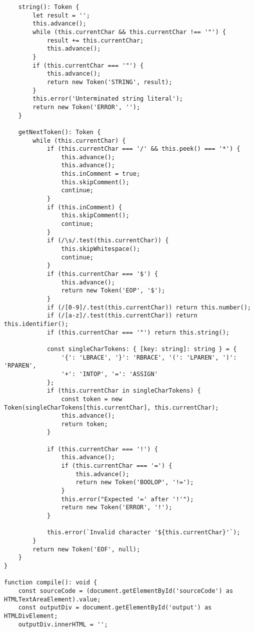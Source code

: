 \documentclass[12pt]{article}
\begin{document}
\begin{lstlisting}
    string(): Token {
        let result = '';
        this.advance();
        while (this.currentChar && this.currentChar !== '"') {
            result += this.currentChar;
            this.advance();
        }
        if (this.currentChar === '"') {
            this.advance();
            return new Token('STRING', result);
        }
        this.error('Unterminated string literal');
        return new Token('ERROR', '');
    }

    getNextToken(): Token {
        while (this.currentChar) {
            if (this.currentChar === '/' && this.peek() === '*') {
                this.advance();
                this.advance();
                this.inComment = true;
                this.skipComment();
                continue;
            }
            if (this.inComment) {
                this.skipComment();
                continue;
            }
            if (/\s/.test(this.currentChar)) {
                this.skipWhitespace();
                continue;
            }
            if (this.currentChar === '$') {
                this.advance();
                return new Token('EOP', '$');
            }
            if (/[0-9]/.test(this.currentChar)) return this.number();
            if (/[a-z]/.test(this.currentChar)) return this.identifier();
            if (this.currentChar === '"') return this.string();

            const singleCharTokens: { [key: string]: string } = {
                '{': 'LBRACE', '}': 'RBRACE', '(': 'LPAREN', ')': 'RPAREN',
                '+': 'INTOP', '=': 'ASSIGN'
            };
            if (this.currentChar in singleCharTokens) {
                const token = new Token(singleCharTokens[this.currentChar], this.currentChar);
                this.advance();
                return token;
            }
            
            if (this.currentChar === '!') {
                this.advance();
                if (this.currentChar === '=') {
                    this.advance();
                    return new Token('BOOLOP', '!=');
                }
                this.error("Expected '=' after '!'");
                return new Token('ERROR', '!');
            }

            this.error(`Invalid character '${this.currentChar}'`);
        }
        return new Token('EOF', null);
    }
}

function compile(): void {
    const sourceCode = (document.getElementById('sourceCode') as HTMLTextAreaElement).value;
    const outputDiv = document.getElementById('output') as HTMLDivElement;
    outputDiv.innerHTML = '';
    

\end{lstlisting}
\end{document}
